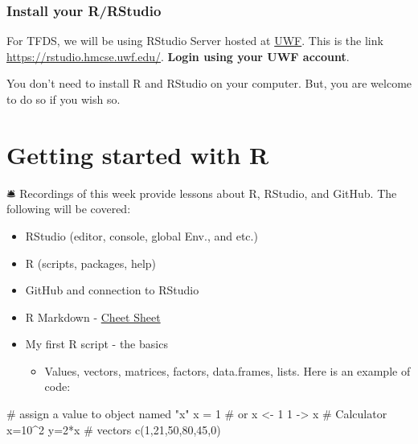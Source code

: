 \documentclass[
  letterpaper,
  DIV=11,
  numbers=noendperiod]{scrreprt}
\newenvironment{Shaded}{\begin{snugshade}}{\end{snugshade}}
\newcommand{\CommentTok}[1]{\textcolor[rgb]{0.37,0.37,0.37}{#1}}
\newcommand{\DecValTok}[1]{\textcolor[rgb]{0.68,0.00,0.00}{#1}}
\newcommand{\FunctionTok}[1]{\textcolor[rgb]{0.28,0.35,0.67}{#1}}
\newcommand{\NormalTok}[1]{\textcolor[rgb]{0.00,0.23,0.31}{#1}}
\newcommand{\OtherTok}[1]{\textcolor[rgb]{0.00,0.23,0.31}{#1}}
\newcommand{\SpecialCharTok}[1]{\textcolor[rgb]{0.37,0.37,0.37}{#1}}
\providecommand{\tightlist}{%
  \setlength{\itemsep}{0pt}\setlength{\parskip}{0pt}}\usepackage{longtable,booktabs,array}
\begin{document}
\hypertarget{install-your-rrstudio}{%
\subsubsection*{Install your R/RStudio}\label{install-your-rrstudio}}

For TFDS, we will be using RStudio Server hosted at
\href{https://uwf.edu}{UWF}. This is the link
\url{https://rstudio.hmcse.uwf.edu/}. \textbf{Login using your UWF
account}.

You don't need to install R and RStudio on your computer. But, you are
welcome to do so if you wish so.

\hypertarget{getting-started-with-r}{%
\section*{Getting started with R}\label{getting-started-with-r}}


🛎️ Recordings of this week provide lessons about R, RStudio, and GitHub.
The following will be covered:

\begin{itemize}
\tightlist
\item
  RStudio (editor, console, global Env., and etc.)
\item
  R (scripts, packages, help)
\item
  GitHub and connection to RStudio
\item
  R Markdown - \href{https://www.markdownguide.org/cheat-sheet/}{Cheet
  Sheet}
\item
  My first R script - the basics

  \begin{itemize}
  \tightlist
  \item
    Values, vectors, matrices, factors, data.frames, lists. Here is an
    example of code:
  \end{itemize}
\end{itemize}

\begin{Shaded}
\begin{Highlighting}[]
\CommentTok{\# assign a value to object named "x"}
\NormalTok{x }\OtherTok{=} \DecValTok{1}
\CommentTok{\# or}
\NormalTok{x }\OtherTok{\textless{}{-}} \DecValTok{1}
\DecValTok{1} \OtherTok{{-}\textgreater{}}\NormalTok{ x  }
\CommentTok{\# Calculator }
\NormalTok{x}\OtherTok{=}\DecValTok{10}\SpecialCharTok{\^{}}\DecValTok{2}
\NormalTok{y}\OtherTok{=}\DecValTok{2}\SpecialCharTok{*}\NormalTok{x}
\CommentTok{\# vectors}
\FunctionTok{c}\NormalTok{(}\DecValTok{1}\NormalTok{,}\DecValTok{21}\NormalTok{,}\DecValTok{50}\NormalTok{,}\DecValTok{80}\NormalTok{,}\DecValTok{45}\NormalTok{,}\DecValTok{0}\NormalTok{)}
\end{Highlighting}
\end{Shaded}
\end{document}
